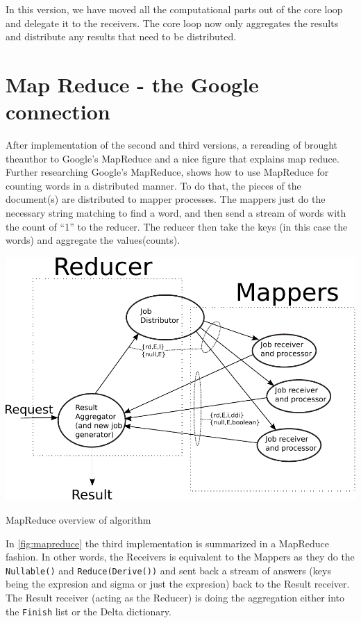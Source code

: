 \documentclass[a4paper,11pt]{report}
\begin{document}
In this version, we have moved all the computational parts
out of the core loop and delegate it to the receivers. The core loop
now only aggregates the results and distribute any results that need
to be distributed.

\section{Map Reduce - the Google connection}
\label{sec:map-reduce-google}

After implementation of the second and third versions, a rereading of
\cite{joe:09} brought theauthor to Google's MapReduce and a nice figure
that explains map reduce. Further researching
Google's MapReduce, \cite{Dean} shows how to use MapReduce for
counting words in a distributed manner. To do that, the pieces of the
document(s) are distributed to mapper processes. The mappers just do the
necessary string matching to find a word, and then send a stream
of words with the count of ``1'' to the reducer. The reducer then take
the keys (in this case the words) and aggregate the values(counts).

\begin{Figure}[htb]
	\centering
	\includegraphics[scale=0.8]{MapReduce-process.pdf}
	\caption{MapReduce overview of algorithm}
	\label{fig:mapreduce}
\end{Figure}

In \autoref{fig:mapreduce} the third implementation is summarized in a
MapReduce fashion. In other words, the Receivers is equivalent to the
Mappers as they do the \texttt{Nullable()} and
\texttt{Reduce(Derive())} and sent back a stream of answers (keys
being the expresion and sigma or just the expresion) back to the
Result receiver. The Result receiver (acting as the Reducer) is doing
the aggregation either into the \texttt{Finish} list or the Delta
dictionary.
\end{document}
